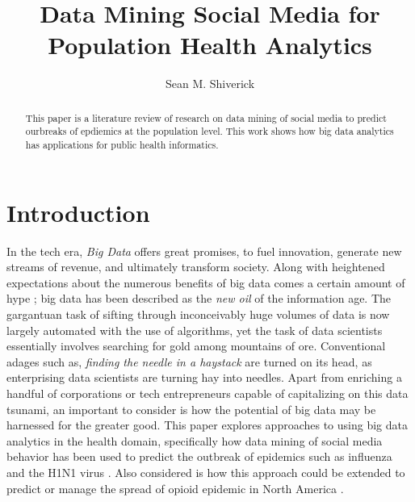 \documentclass[sigconf]{acmart}
\begin{document}
\title{Data Mining Social Media for Population Health Analytics}
\author{Sean M. Shiverick}


\begin{abstract}
This paper is a literature review of research on data mining of social media to predict ourbreaks of epdiemics at the population level. This work shows how big data analytics has applications for public health informatics.
\end{abstract}



\maketitle

\section{Introduction}

In the tech era, \textit{Big Data} offers great promises, to fuel innovation, generate new streams of revenue, and ultimately transform society. Along with heightened expectations about the numerous benefits of big data comes a certain amount of hype \cite{gupta15}; big data has been described as the \textit{new oil} of the information age. The gargantuan task of sifting through inconceivably huge volumes of data is now largely automated with the use of algorithms, yet the task of data scientists essentially involves searching for gold among mountains of ore. Conventional adages such as, \textit{finding the needle in a haystack} are turned on its head, as enterprising data scientists are turning hay into needles. Apart from enriching a handful of corporations or tech entrepreneurs capable of capitalizing on this data tsunami, an important to consider is how the potential of big data may be harnessed for the greater good. This paper explores approaches to using big data analytics in the health domain, specifically how data mining of social media behavior has been used to predict the outbreak of epidemics such as influenza and the H1N1 virus \cite{signorini11,yuan13}. Also considered is how this approach could be extended to predict or manage the spread of opioid epidemic in North America \cite{volkow14}.
\end{document}
